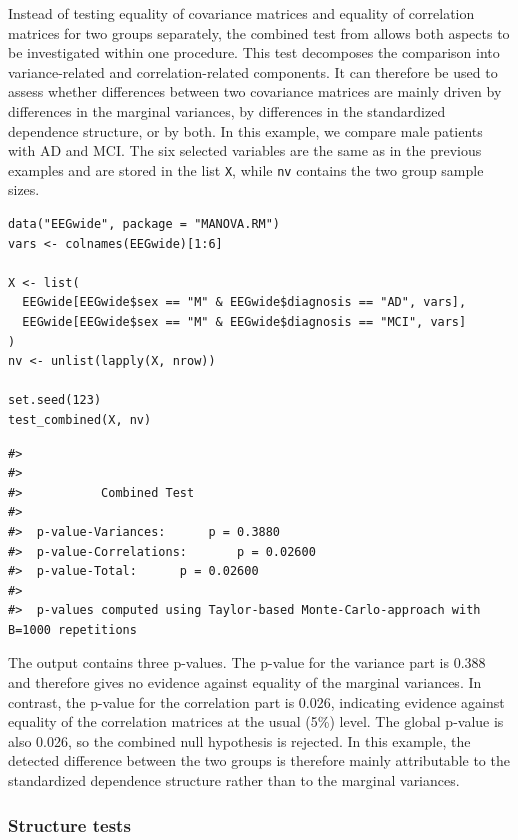 Instead of testing equality of covariance matrices and equality of correlation
matrices for two groups separately, the combined test from \citet{sattler2023} allows both
aspects to be investigated within one procedure. This test
decomposes the comparison into variance-related and correlation-related components. It can therefore be used to assess whether
differences between two covariance matrices are mainly driven by differences in
the marginal variances, by differences in the standardized dependence structure,
or by both.
In this example, we compare male patients with AD and MCI. The six selected
variables are the same as in the previous examples and are stored in the list
\texttt{X}, while \texttt{nv} contains the two group sample sizes.

\begin{verbatim}
data("EEGwide", package = "MANOVA.RM")
vars <- colnames(EEGwide)[1:6]

X <- list(
  EEGwide[EEGwide$sex == "M" & EEGwide$diagnosis == "AD", vars],
  EEGwide[EEGwide$sex == "M" & EEGwide$diagnosis == "MCI", vars]
)
nv <- unlist(lapply(X, nrow))

set.seed(123)
test_combined(X, nv)
\end{verbatim}

\begin{verbatim}
#> 
#> 
#>           Combined Test 
#> 
#>  p-value-Variances:      p = 0.3880
#>  p-value-Correlations:       p = 0.02600
#>  p-value-Total:      p = 0.02600
#>  
#>  p-values computed using Taylor-based Monte-Carlo-approach with B=1000 repetitions
\end{verbatim}

The output contains three p-values. The p-value for the variance part is
0.388 and therefore gives no evidence against equality of the marginal
variances. In contrast, the p-value for the correlation part is 0.026, indicating
evidence against equality of the correlation matrices at the usual (5\%)
level. The global p-value is also 0.026, so the combined null hypothesis is
rejected. In this example, the detected difference between the two groups is
therefore mainly attributable to the standardized dependence structure rather
than to the marginal variances.

\subsubsection{Structure tests}\label{structure-tests}

